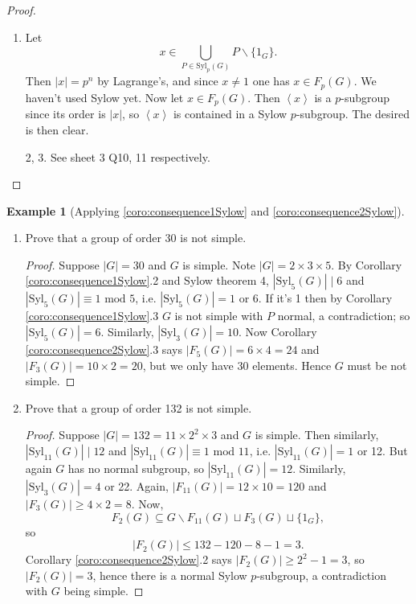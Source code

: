 \documentclass[a4paper]{article}
\newcommand{\la}{\left\langle}
\newcommand{\ra}{\right\rangle}
\newcommand{\Syl}{\text{Syl}}
\newcommand{\Mod}{\text{ mod }}
\theoremstyle{definition}
\newtheorem{example}[defn]{Example}
\begin{document}
\begin{proof}
\begin{enumerate}
\item Let \[
x\in \bigcup_{P\in\Syl_p(G)} P\backslash \{1_G\}.
\]
Then $|x|=p^n$ by Lagrange's, and since $x\neq 1$ one has $x\in F_p(G)$. We haven't used Sylow yet. Now let $x\in F_p(G)$. Then $\la x\ra$ is a $p$-subgroup since its order is $|x|$, so $\la x\ra$ is contained in a Sylow $p$-subgroup. The desired is then clear.
\item[2, 3.] See sheet 3 Q10, 11 respectively.
\end{enumerate}
\end{proof}

\begin{example}[Applying \ref{coro:consequence1Sylow} and \ref{coro:consequence2Sylow}]
\label{example:strategy2}
\begin{enumerate}
\item Prove that a group of order 30 is not simple.
\begin{proof}
Suppose $|G|=30$ and $G$ is simple. Note $|G|=2\times 3\times 5$. By Corollary \ref{coro:consequence1Sylow}.2 and Sylow theorem 4, $|\Syl_5(G)|\mid 6$ and $|\Syl_5(G)|\equiv 1\Mod 5$, i.e. $|\Syl_5(G)|=1$ or 6. If it's 1 then by Corollary \ref{coro:consequence1Sylow}.3 $G$ is not simple with $P$ normal, a contradiction; so $|\Syl_5(G)|=6$. Similarly, $|\Syl_3(G)|=10$. Now Corollary \ref{coro:consequence2Sylow}.3 says $|F_5(G)|=6\times 4=24$ and $|F_3(G)|=10\times 2=20$, but we only have 30 elements. Hence $G$ must be not simple.
\end{proof}
\item Prove that a group of order 132 is not simple.
\begin{proof}
Suppose $|G|=132=11\times 2^2\times 3$ and $G$ is simple. Then similarly, $|\Syl_{11}(G)| \mid 12$ and $|\Syl_{11}(G)|\equiv 1\Mod 11$, i.e. $|\Syl_{11}(G)|=1$ or 12. But again $G$ has no normal subgroup, so $|\Syl_{11}(G)|=12$. Similarly, $|\Syl_3(G)|=4$ or 22. Again, $|F_{11}(G)|=12\times 10=120$ and $|F_3(G)|\geq 4\times 2=8$. Now,
\[
F_2(G)\subseteq G\backslash F_{11}(G) \sqcup F_3(G) \sqcup \{1_G\},
\]
so
\[
|F_2(G)|\leq 132-120-8-1=3.
\]
Corollary \ref{coro:consequence2Sylow}.2 says $|F_2(G)|\geq 2^2-1=3$, so $|F_2(G)|=3$, hence there is a normal Sylow $p$-subgroup, a contradiction with $G$ being simple.
\end{proof}
\end{enumerate}
\end{example}
\end{document}
